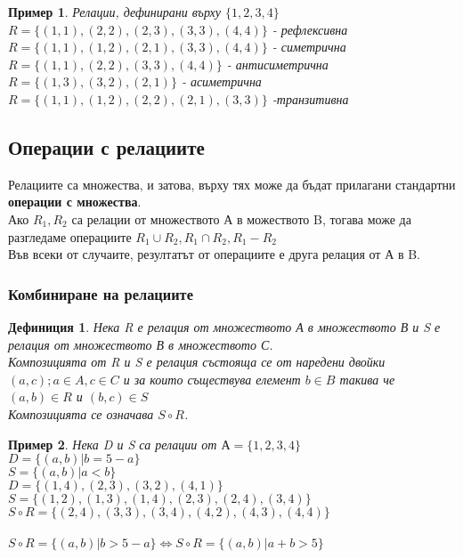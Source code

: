 \documentclass[fleqn, 12pt]{article}
\newtheorem{example}{Пример}[subsection]
\newtheorem{definition}{Дефиниция}[subsection]
\begin{document}
\begin{example}
Релации, дефинирани върху $\{1, 2, 3, 4 \}$ \\
$R = \{ (1, 1), (2, 2), (2, 3), (3, 3), (4, 4) \}$ - рефлексивна \\
$R = \{(1, 1), (1, 2), (2, 1), (3, 3), (4, 4) \}$  - симетрична \\
$R = \{(1, 1), (2, 2), (3, 3), (4, 4) \}$ - антисиметрична \\
$R = \{(1, 3), (3, 2), (2, 1) \}$ - асиметрична \\
$R = \{(1, 1), (1, 2), (2, 2), (2, 1), (3, 3)\}$ -транзитивна\\
\end{example}

\subsection{Операции с релациите}
Релациите са множества, и затова, върху тях може да бъдат прилагани стандартни \textbf{операции с множества}. \\
Ако $R_1, R_2$ са релации от множеството А в можеството B, тогава може да разгледаме операциите $R_1 \cup R_2, R_1 \cap R_2, R_1 - R_2$ \\
Във всеки от случаите, резултатът от операциите е друга релация от А в B. \\

\subsubsection{Комбиниране на релациите}

\begin{definition}
Нека R е релация от множеството А в множеството В и S е релация от множеството В в множеството С. \\
Композицията от R и S е релация състояща се от наредени двойки $(a,c); a \in A, c \in C$ и за които съществува елемент $ b \in B$ такива че $(a, b) \in R$ и $(b,c) \in S$ \\
Композицията се означава $S \circ R$.
\end{definition}

\begin{example}
Нека D и S са релации от $А = \{1, 2, 3, 4 \}$ \\
$D = \{ (a,b) | b = 5-a \}$ \\
$S = \{ (a,b) | a < b\}$\\
$D = \{(1, 4), (2, 3), (3, 2), (4, 1) \}$ \\
$S = \{ (1, 2), (1, 3), (1, 4), (2, 3), (2, 4), (3, 4) \}$\\
$S \circ R = \{ (2, 4), (3, 3), (3, 4), (4, 2), (4, 3), (4, 4) \}$\\
\\
$S \circ R =  \{ (a,b) | b > 5-a \} \Leftrightarrow S \circ R =  \{ (a,b) | a + b > 5 \}$
\end{example}
\end{document}
